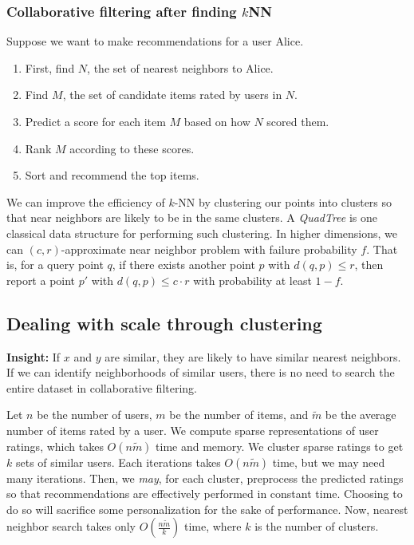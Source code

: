 \documentclass[titlepage, 12pt, leqno]{article}
\begin{document}
\subsubsection{Collaborative filtering after finding $k$NN}
Suppose we want to make recommendations for a user Alice.
\begin{enumerate}
    \item First, find $N$, the set of nearest neighbors to Alice.
    \item Find $M$, the set of candidate items rated by users in $N$.
    \item Predict a score for each item $M$ based on how $N$ scored them.
    \item Rank $M$ according to these scores.
    \item Sort and recommend the top items.
\end{enumerate}

We can improve the efficiency of $k$-NN by clustering our points into clusters so
that near neighbors are likely to be in the same clusters. A \textit{QuadTree} is
one classical data structure for performing such clustering. In higher dimensions,
we can $(c,r)$-approximate near neighbor problem with failure probability $f$.
That is, for a query point $q$, if there exists another point $p$ with $d(q,p)
\le r$, then report a point $p'$ with $d(q,p) \le c\cdot r$ with probability at 
least $1-f$.

\subsection{Dealing with scale through clustering}
\textbf{Insight:} If $x$ and $y$ are similar, they are likely to have similar
nearest neighbors. If we can identify neighborhoods of similar users, there is no
need to search the entire dataset in collaborative filtering.

Let $n$ be the number of users, $m$ be the number of items, and $\tilde{m}$ be
the average number of items rated by a user. We compute sparse representations of
user ratings, which takes $O(n \tilde{m})$ time and memory. We cluster sparse 
ratings to get $k$ sets of similar users. Each iterations takes $O(n\tilde{m})$
time, but we may need many iterations. Then, we \textit{may}, for each cluster,
preprocess the predicted ratings so that recommendations are effectively 
performed in constant time. Choosing to do so will sacrifice some personalization
for the sake of performance. Now, nearest neighbor search takes only 
$O(\frac{n\tilde{m}}{k})$ time, where $k$ is the number of clusters.
\end{document}

